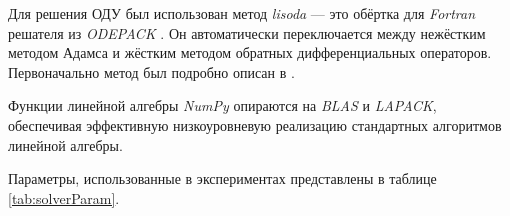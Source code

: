 Для решения ОДУ был использован метод \textit{lisoda} --- это обёртка для \textit{Fortran} решателя из \textit{ODEPACK} \cite{Hindmarsh}. Он автоматически переключается между нежёстким методом Адамса и жёстким методом обратных дифференциальных операторов. Первоначально метод был подробно описан в \cite{Petzold}.

Функции линейной алгебры \textit{NumPy} опираются на \textit{BLAS} и \textit{LAPACK}, обеспечивая эффективную низкоуровневую реализацию стандартных алгоритмов линейной алгебры. 

Параметры, использованные в экспериментах представлены в таблице \ref{tab:solverParam}.

{}
{}
